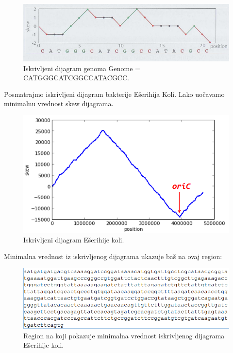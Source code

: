 \begin{figure}[h]
\caption{Iskrivljeni dijagram genoma Genome = CATGGGCATCGGCCATACGCC.}
\centering
\includegraphics[width=1\textwidth]{poglavlja/1/slike/skew.png}
\end{figure} 

Posmatrajmo iskrivljeni dijagram bakterije Ešerihija Koli. Lako uočavamo minimalnu vrednost skew dijagrama.

\begin{figure}[h]
\caption{Iskrivljeni dijagram Ešerihije koli.}
\centering
\includegraphics[width=1\textwidth]{poglavlja/1/slike/Ecoli_oriC.png}
\end{figure} 

Minimalna vrednost iz iskrivljenog dijagrama ukazuje baš na ovaj region:

\begin{figure}[h]
\caption{Region na koji pokazuje minimalna vrednost iskrivljenog dijagrama Ešerihije koli.}
\centering
\includegraphics[width=1\textwidth]{poglavlja/1/slike/ecoli_region.png}
\end{figure} 

